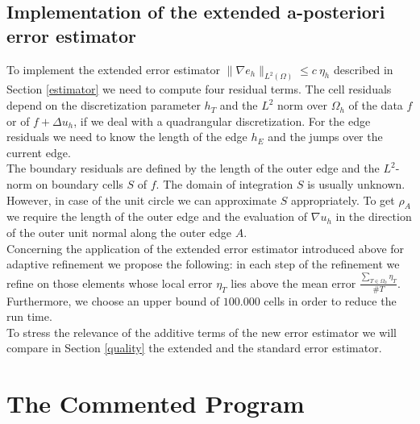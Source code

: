 \documentclass[a4paper, 11pt, twoside]{article}
\begin{document}
\subsection{Implementation of the extended a-posteriori error estimator}
To implement the extended error estimator $\| \nabla e_h\|_{L^2(\Omega)} \leq c\ \eta_h$ described in Section \ref{estimator} we need to compute four residual terms.
The cell residuals depend on the discretization parameter $h_T$ and the $L^2$ norm over $\Omega_h$ of the data $f$ or of $f + \Delta u_h$, if we deal with a quadrangular discretization.
For the edge residuals we need to know the length of the edge $h_E$ and the jumps over the current edge.\\
The boundary residuals are defined by the length of the outer edge and the $L^2$- norm on boundary cells $S$ of $f$.
The domain of integration $S$ is usually unknown. However, in case of the unit circle we can approximate $S$ appropriately.
To get $\rho_A$ we require the length of the outer edge and the evaluation of $\nabla u_h$ in the direction of the outer unit normal along the outer edge $A$.\\
Concerning the application of the extended error estimator introduced above for adaptive refinement we propose the following: 
in each step of the refinement we refine on those elements whose local error $\eta_T$ lies above the mean error $\frac{\sum_{T \in \Omega_h}\eta_T}{\#T}$.
Furthermore, we choose an upper bound of $100.000$ cells in order to reduce the run time.\\
To stress the relevance of the additive terms of the new error estimator we will compare in Section \ref{quality} the extended and the standard error estimator.


\section{The Commented Program}
\end{document}

